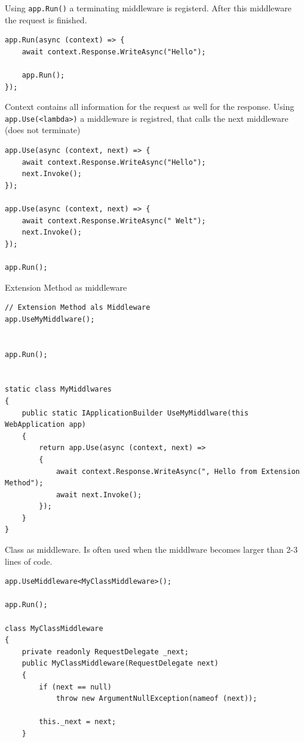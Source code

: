 \documentclass[11pt,twoside,landscape]{article}
\begin{document}
\begin{multicols}{3}
Using \texttt{app.Run()} a terminating middleware is registerd.
After this middleware the request is finished.
\begin{verbatim}
app.Run(async (context) => {
    await context.Response.WriteAsync("Hello");

    app.Run();
});
\end{verbatim}

Context contains all information for the request as well for the response.
Using \texttt{app.Use(<lambda>)} a middleware is registred, that calls the next middleware (does not terminate)
\begin{verbatim}
app.Use(async (context, next) => {
    await context.Response.WriteAsync("Hello");    
    next.Invoke();
});

app.Use(async (context, next) => {
    await context.Response.WriteAsync(" Welt");    
    next.Invoke();
});

app.Run();
\end{verbatim}

Extension Method as middleware
\begin{verbatim}
// Extension Method als Middleware
app.UseMyMiddlware();


app.Run();


static class MyMiddlwares
{
    public static IApplicationBuilder UseMyMiddlware(this WebApplication app)
    {
        return app.Use(async (context, next) =>
        {
            await context.Response.WriteAsync(", Hello from Extension Method");
            await next.Invoke();
        });
    }
}
\end{verbatim}

Class as middleware.
Is often used when the middlware becomes larger than 2-3 lines of code.
\begin{verbatim}
app.UseMiddleware<MyClassMiddleware>();

app.Run();

class MyClassMiddleware
{
    private readonly RequestDelegate _next;
    public MyClassMiddleware(RequestDelegate next)
    {
        if (next == null)
            throw new ArgumentNullException(nameof (next));

        this._next = next;
    }


\end{verbatim}
\end{multicols}
\end{document}
